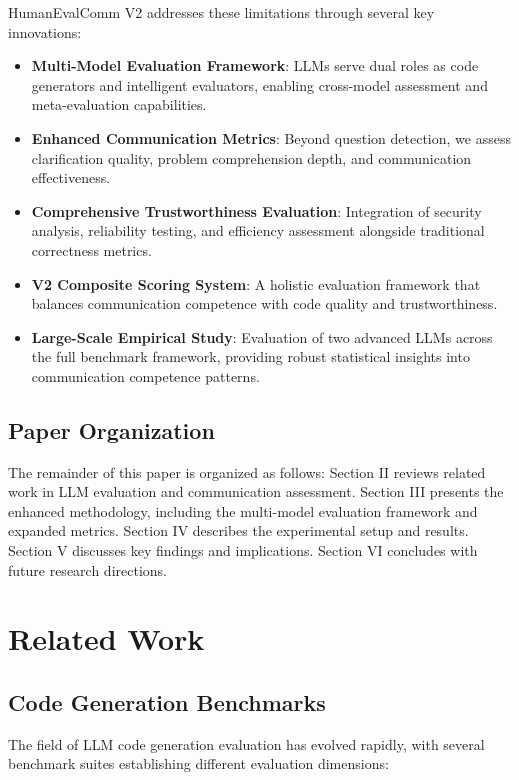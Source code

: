 \documentclass[conference]{IEEEtran}
\begin{document}
HumanEvalComm V2 addresses these limitations through several key innovations:

\begin{itemize}
    \item \textbf{Multi-Model Evaluation Framework}: LLMs serve dual roles as code generators and intelligent evaluators, enabling cross-model assessment and meta-evaluation capabilities.
    \item \textbf{Enhanced Communication Metrics}: Beyond question detection, we assess clarification quality, problem comprehension depth, and communication effectiveness.
    \item \textbf{Comprehensive Trustworthiness Evaluation}: Integration of security analysis, reliability testing, and efficiency assessment alongside traditional correctness metrics.
    \item \textbf{V2 Composite Scoring System}: A holistic evaluation framework that balances communication competence with code quality and trustworthiness.
    \item \textbf{Large-Scale Empirical Study}: Evaluation of two advanced LLMs across the full benchmark framework, providing robust statistical insights into communication competence patterns.
\end{itemize}

\subsection{Paper Organization}

The remainder of this paper is organized as follows: Section II reviews related work in LLM evaluation and communication assessment. Section III presents the enhanced methodology, including the multi-model evaluation framework and expanded metrics. Section IV describes the experimental setup and results. Section V discusses key findings and implications. Section VI concludes with future research directions.

\section{Related Work}

\subsection{Code Generation Benchmarks}

The field of LLM code generation evaluation has evolved rapidly, with several benchmark suites establishing different evaluation dimensions:
\end{document}
